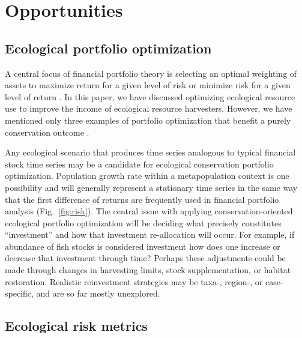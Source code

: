 \section{Opportunities}\label{opportunities}

\subsection{Ecological portfolio optimization}\label{ecological-portfolio-optimization}

A central focus of financial portfolio theory is selecting an optimal weighting of assets to maximize return for a given level of risk or minimize risk for a given level of return \citep{markowitz1952}. In this paper, we have discussed optimizing ecological resource use to improve the income of ecological resource harvesters. However, we have mentioned only three examples of portfolio optimization that benefit a purely conservation outcome \citep{crowe2008, ando2012, anderson2014}.

Any ecological scenario that produces time series analogous to typical financial stock time series may be a candidate for ecological conservation portfolio optimization. Population growth rate within a metapopulation context is one possibility and will generally represent a stationary time series in the same way that the first difference of returns are frequently used in financial portfolio analysis \citep{anderson2014} (Fig.~\ref{fig:risk}). The central issue with applying conservation-oriented ecological portfolio optimization will be deciding what precisely constitutes ``investment'' and how that investment re-allocation will occur. For example, if abundance of fish stocks is considered investment how does one increase or decrease that investment through time? Perhaps these adjustments could be made through changes in harvesting limits, stock supplementation, or habitat restoration. Realistic reinvestment strategies may be taxa-, region-, or case-specific, and are so far mostly unexplored.

\subsection{Ecological risk metrics}\label{ecological-risk-metrics}

